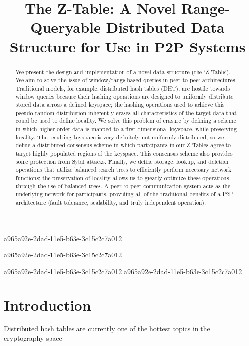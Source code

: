 \documentclass[12pt]{article}
\title{The Z-Table: A Novel Range-Queryable Distributed Data Structure for Use in P2P Systems}
\begin{document}
a965a92e-2dad-11e5-b63e-3c15c2c7a012\maketitle

a965a92e-2dad-11e5-b63e-3c15c2c7a012\begin{abstract}
We present the design and implementation of a novel data structure (the 'Z-Table'). We aim to solve the issue of window/range-based queries in peer to peer architectures. Traditional models, for example,  distributed hash tables (DHT), are hostile towards window queries because their hashing operations are designed to uniformly distribute stored data across a defined keyspace; the hashing operations used to achieve this pseudo-random distribution inherently erases all characteristics of the target data that could be used to define locality. We solve this problem of erasure by defining a scheme in which higher-order data is mapped to a first-dimensional keyspace, while preserving locality. The resulting keyspace is very definitely not uniformly distributed, so we define a distributed consensus scheme in which participants in our Z-Tables agree to target highly populated regions of the keyspace. This consensus scheme also provides some protection from Sybil attacks. Finally, we define storage, lookup, and deletion operations that utilize balanced search trees to efficiently perform necessary network functions; the preservation of locality allows us to greatly optimize these operations through the use of balanced trees. A peer to peer communication system acts as the underlying network for participants, providing all of the traditional benefits of a P2P architecture (fault tolerance, scalability, and truly independent operation).
\end{abstract}

a965a92e-2dad-11e5-b63e-3c15c2c7a012
\newpage
a965a92e-2dad-11e5-b63e-3c15c2c7a012\section{Introduction}
Distributed hash tables are currently one of the hottest topics in the cryptography space~\cite{Stoica:2001dj,Rowstron:2001ea,Ratnasamy:2001wn}

\printbibliography
\end{document}
